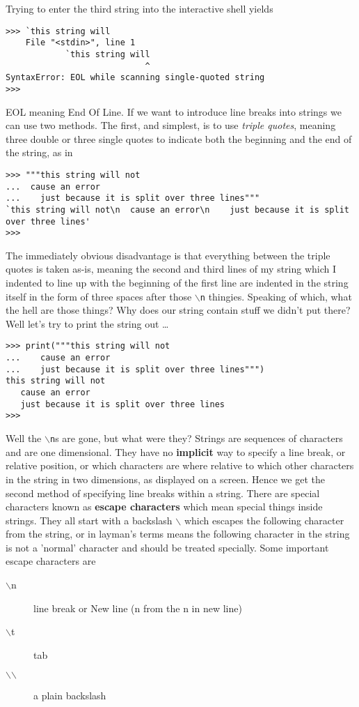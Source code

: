 Trying to enter the third string into the interactive shell yields
\begin{lstlisting}
>>> `this string will
    File "<stdin>", line 1
            `this string will
                            ^
SyntaxError: EOL while scanning single-quoted string
>>>
\end{lstlisting}

EOL meaning End Of Line. If we want to introduce line breaks into   strings we can use two methods. The first, and simplest, is to use   \textit{triple quotes}, meaning three double or three single quotes to indicate   both the beginning and the end of the string, as in
\begin{lstlisting}
>>> """this string will not
...  cause an error
...    just because it is split over three lines"""
`this string will not\n  cause an error\n    just because it is split over three lines'
>>>
\end{lstlisting}

The immediately obvious disadvantage is that everything between the   triple quotes is taken as-is, meaning the second and third lines of my   string which I indented to line up with the beginning of the first line   are indented in the string itself in the form of three spaces after   those \texttt{$\backslash$n} thingies. Speaking of which, what the hell are those things?   Why does our string contain stuff we didn't put there? Well let's try   to print the string out \ldots
\begin{lstlisting}
>>> print("""this string will not
...    cause an error
...    just because it is split over three lines""")
this string will not
   cause an error
   just because it is split over three lines
>>>
\end{lstlisting}

Well the \texttt{$\backslash$n}s are gone, but what were they? Strings are sequences   of characters and are one dimensional. They have no   \textbf{implicit} way to specify a line break, or relative   position, or which characters are where relative to which other   characters in the string in two dimensions, as displayed on a screen.   Hence we get the second method of specifying line breaks within a   string. There are special characters known as \textbf{escape     characters} which mean special things inside strings. They all   start with a backslash \texttt{$\backslash$} which escapes the following character from   the string, or in layman's terms means the following character in the   string is not a 'normal' character and should be treated specially.   Some important escape characters are
\begin{description}
	\item[$\backslash$n] line break or New line (n from the n in new line)
	\item[$\backslash$t] tab
	\item[$\backslash$$\backslash$] a plain backslash
\end{description}

